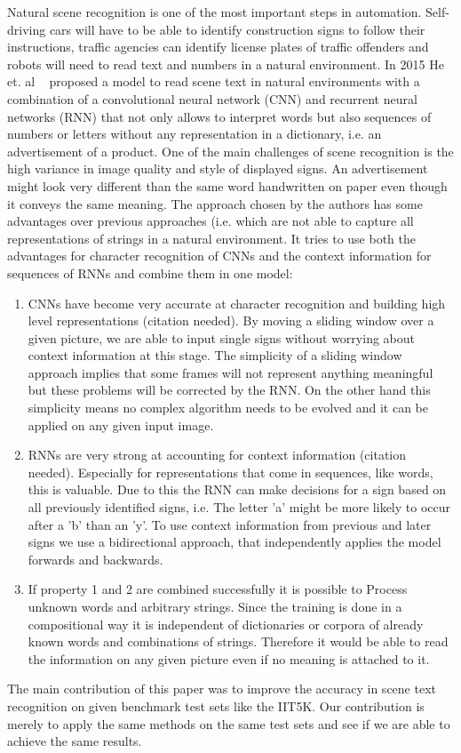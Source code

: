 \documentclass{utue} %
\begin{document}
Natural scene recognition is one of the most important steps in automation. Self-driving cars will have to be able to identify construction signs to follow their instructions, traffic agencies can identify license plates of traffic offenders %
and robots will need to read text and numbers in a natural environment. In 2015 He et. al ~\cite{2015arXiv150604395H} proposed a model to read scene text in natural environments with a combination of a convolutional neural network (CNN) and recurrent neural networks (RNN) that not only allows to interpret words but also sequences of numbers or letters without any representation in a dictionary, i.e. an advertisement of a product. One of the main challenges of scene recognition is the high variance in image quality and style of displayed signs. An advertisement might look very different than the same word handwritten on paper even though it conveys the same meaning. The approach chosen by the authors has some advantages over previous approaches (i.e. %
which are not able to capture all representations of strings in a natural environment. It tries to use both the advantages for character recognition of CNNs and the context information for sequences of RNNs and combine them in one model: \\
\begin{enumerate}
	\item CNNs have become very accurate at character recognition and building high level representations (citation needed). By moving a sliding window over a given picture, we are able to input single signs without worrying about context information at this stage. The simplicity of a sliding window approach implies that some frames will not represent anything meaningful but these problems will be corrected by the RNN. On the other hand this simplicity means no complex algorithm needs to be evolved and it can be applied on any given input image.
	\item RNNs are very strong at accounting for context information (citation needed). Especially for representations that come in sequences, like words, this is valuable. Due to this the RNN can make decisions for a sign based on all previously identified signs, i.e. The letter 'a' might be more likely to occur after a 'b' than an 'y'. To use context information from previous and later signs we use a bidirectional approach, that independently applies the model forwards and backwards. 
	\item If property 1 and 2 are combined successfully it is possible to Process unknown words and arbitrary strings. Since the training is done in a compositional way it is independent of dictionaries or corpora of already known words and combinations of strings. Therefore it would be able to read the information on any given picture even if no meaning is attached to it. 
\end{enumerate}
The main contribution of this paper was to improve the accuracy in scene text recognition on given benchmark test sets like the IIT5K. Our contribution is merely to apply the same methods on the same test sets and see if we are able to achieve the same results. 
\end{document}

